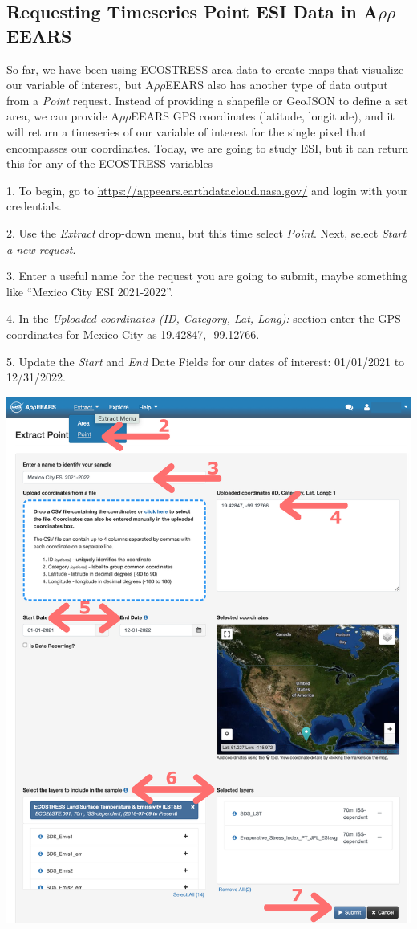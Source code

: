 \documentclass[oneside,a4paper,11pt,explicit]{book}
\begin{document}
\subsection{Requesting Timeseries Point ESI Data in A$\rho\rho$EEARS}

So far, we have been using ECOSTRESS area data to create maps that visualize our variable of interest, but A$\rho\rho$EEARS also has another type of data output from a \textit{Point} request. Instead of providing a shapefile or GeoJSON to define a set area, we can provide A$\rho\rho$EEARS GPS coordinates (latitude, longitude), and it will return a timeseries of our variable of interest for the single pixel that encompasses our coordinates. Today, we are going to study ESI, but it can return this for any of the ECOSTRESS variables 

1. To begin, go to \href{https://appeears.earthdatacloud.nasa.gov/}{https://appeears.earthdatacloud.nasa.gov/} and login with your credentials. 

2. Use the \textit{Extract} drop-down menu, but this time select \textit{Point}. Next, select \textit{Start a new request}. 

3. Enter a useful name for the request you are going to submit, maybe something like ``Mexico City ESI 2021-2022''. 

4. In the \textit{Uploaded coordinates (ID, Category, Lat, Long):} section enter the GPS coordinates for Mexico City as 19.42847, -99.12766.

5. Update the \textit{Start} and \textit{End} Date Fields for our dates of interest: 01/01/2021 to 12/31/2022.

\centerline{\includegraphics[width=.6\textwidth]{ESIpointRequest.png}}
\end{document}
